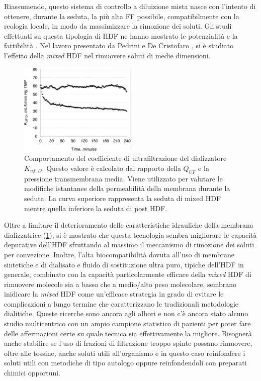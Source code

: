 Riassumendo, questo sistema di controllo a diluizione mista nasce con l'intento di ottenere, durante la seduta, la più alta FF possibile, compatibilmente con la reologia locale, in modo da massimizzare la rimozione dei soluti.
Gli studi effettuati su questa tipologia di HDF  ne hanno mostrato le potenzialità e la fattibilità \cite{pedrini, pedrini2, pedrini3}.
Nel lavoro presentato da Pedrini e De Cristofaro \cite{pedrini3}, si è studiato l'effetto della \textit{mixed} HDF nel rimuovere soluti di medie dimensioni.
\begin{figure}[htb]
	\centering
		\includegraphics[width=0.5\textwidth]{immagini/NIC/idraulico.eps}
		\caption{Comportamento del coefficiente di ultrafiltrazione del dializzatore $K_{uf,D}$. Questo valore è calcolato dal rapporto della $Q_{UF}$ e la pressione transmembrana media. Viene utilizzato per valutare le modifiche istantanee della permeabilità della membrana durante la seduta. La curva superiore rappresenta la seduta di mixed HDF mentre quella inferiore la seduta di post HDF.}\label{idraulico}
\end{figure}
Oltre a limitare il deterioramento delle caratteristiche idrauliche della membrana dializzatrice (\figurename\ref{idraulico}), si è mostrato che questa tecnologia sembra migliorare le capacità depurative dell'HDF sfruttando al massimo il meccanismo di rimozione dei soluti per convezione. Inoltre, l'alta biocompatibilità dovuta all'uso di membrane sintetiche e di dialisato e fluido di sostituzione ultra puro, tipiche dell'HDF in generale, combinato con la capacità particolarmente efficace della \textit{mixed} HDF di rimuovere molecole sia a basso che a medio/alto peso molecolare, sembrano inidicare la \textit{mixed} HDF come un'efficace strategia in grado di evitare le complicazioni a lungo termine che caratterizzano le tradizionali metodologie dialitiche. Queste ricerche sono ancora agli albori e non c'è ancora stato alcuno studio multicentrico con un ampio campione statistico di pazienti per poter fare delle affermazioni certe su quale tecnica sia effettivamente la migliore. Bisognerà  anche stabilire se l'uso di frazioni di filtrazione troppo spinte possano rimuovere, oltre alle tossine, anche soluti utili all'organismo e in questo caso reinfondere i soluti utili con metodiche di tipo autologo \cite{bib:wratten} oppure reinfondendoli con preparati chimici opportuni.

